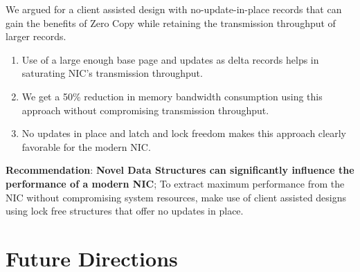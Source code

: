 We argued for a client assisted design with no-update-in-place records that can gain the benefits of Zero Copy while retaining the transmission throughput of larger records.
  \begin{enumerate}
  \item Use of a large enough base page and updates as delta records helps in saturating NIC's transmission throughput.
  \item We get a 50\% reduction in memory bandwidth consumption using this approach without compromising transmission throughput.
  \item No updates in place and latch and lock freedom makes this approach clearly favorable for the modern NIC. 
  \end{enumerate}
  \textbf{Recommendation}: \textbf{Novel Data Structures can significantly influence the performance of a modern NIC}; To extract maximum performance from the NIC without compromising system resources, make use of client assisted designs using lock free structures that offer no updates in place.

\section{Future Directions}

